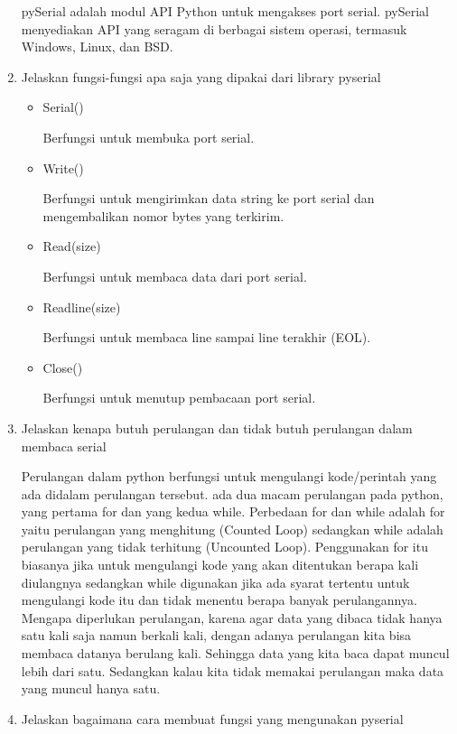 \begin{enumerate}
pySerial adalah modul API Python untuk mengakses port serial. pySerial menyediakan API yang seragam di berbagai sistem operasi, termasuk Windows, Linux, dan BSD.

\item Jelaskan fungsi-fungsi apa saja yang dipakai dari library pyserial

	\begin{itemize}
	\item Serial()
	
	Berfungsi untuk membuka port serial.
	
	\item Write()
	
	Berfungsi untuk mengirimkan data string ke port serial dan mengembalikan nomor bytes yang terkirim.
	
	\item Read(size)
	
	Berfungsi untuk membaca data dari port serial.
	
	\item Readline(size)
	
	Berfungsi untuk membaca line sampai line terakhir (EOL). 
	
	\item Close()
	
	Berfungsi untuk menutup pembacaan port serial.
	\end{itemize}

\item Jelaskan kenapa butuh perulangan dan tidak butuh perulangan dalam membaca serial

Perulangan dalam python berfungsi untuk mengulangi kode/perintah yang ada didalam perulangan tersebut. ada dua macam perulangan pada python, yang pertama for dan yang kedua while.
Perbedaan for dan while adalah for yaitu perulangan yang menghitung (Counted Loop) sedangkan while adalah perulangan yang tidak terhitung (Uncounted Loop). Penggunakan for itu biasanya jika untuk mengulangi kode yang akan ditentukan berapa kali diulangnya sedangkan while digunakan jika ada syarat tertentu untuk mengulangi kode itu dan tidak menentu berapa banyak perulangannya.
Mengapa diperlukan perulangan, karena agar data yang dibaca tidak hanya satu kali saja namun berkali kali, dengan adanya perulangan kita bisa membaca datanya berulang kali. Sehingga data yang kita baca dapat muncul lebih dari satu. Sedangkan kalau kita tidak memakai perulangan maka data yang muncul hanya satu.

\item Jelaskan bagaimana cara membuat fungsi yang mengunakan pyserial


\end{enumerate}
